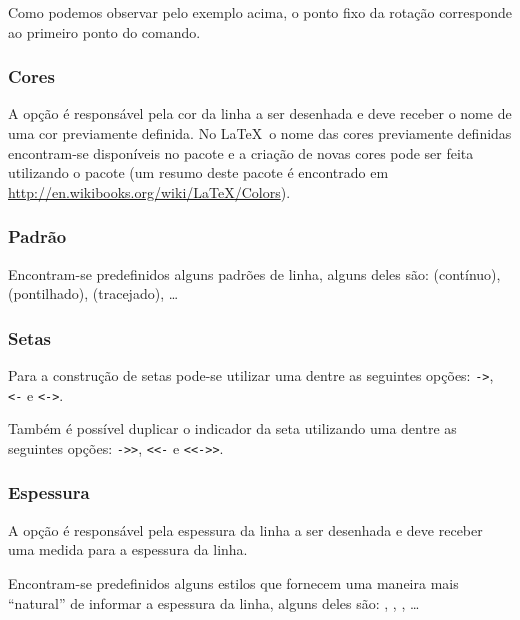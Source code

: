 Como podemos observar pelo exemplo acima, o ponto fixo da rota\c{c}\~{a}o corresponde ao primeiro ponto do comando.

\subsubsection{Cores}
A op\c{c}\~{a}o  \'{e} respons\'{a}vel pela cor da linha a ser desenhada e deve receber o nome de uma cor previamente definida. No \LaTeX \, o nome das cores previamente definidas encontram-se dispon\'{i}veis no pacote  e a cria\c{c}\~{a}o de novas cores pode ser feita utilizando o pacote  (um resumo deste pacote \'{e} encontrado em \url{http://en.wikibooks.org/wiki/LaTeX/Colors}). \\

\subsubsection{Padr\~{a}o}
Encontram-se predefinidos alguns padr\~{o}es de linha, alguns deles s\~{a}o:  (cont\'{i}nuo),  (pontilhado),  (tracejado), \ldots \\

\subsubsection{Setas}
Para a constru\c{c}\~{a}o de setas pode-se utilizar uma dentre as seguintes op\c{c}\~{o}es: \lstinline!->!, \lstinline!<-! e \lstinline!<->!. \\

Tamb\'{e}m \'{e} poss\'{i}vel duplicar o indicador da seta utilizando uma dentre as seguintes op\c{c}\~{o}es: \lstinline!->>!, \lstinline!<<-! e \lstinline!<<->>!. \\

\subsubsection{Espessura}
A op\c{c}\~{a}o  \'{e} respons\'{a}vel pela espessura da linha a ser desenhada e deve receber uma medida para a espessura da linha.

Encontram-se predefinidos alguns estilos que fornecem uma maneira mais ``natural'' de informar a espessura da linha, alguns deles s\~{a}o: , ,  , \ldots \\

